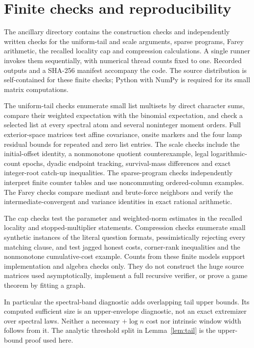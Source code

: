 \section{Finite checks and reproducibility}\label{sec:checks}
The ancillary directory contains the construction checks and independently written checks for the uniform-tail and scale arguments, sparse programs, Farey arithmetic, the recalled locality cap and compression calculations. A single runner invokes them sequentially, with numerical thread counts fixed to one. Recorded outputs and a SHA-256 manifest accompany the code. The source distribution is self-contained for these finite checks; Python with NumPy is required for its small matrix computations.

The uniform-tail checks enumerate small list multisets by direct character sums, compare their weighted expectation with the binomial expectation, and check a selected list at every spectral atom and several noninteger moment orders. Full exterior-space matrices test affine covariance, onsite markers and the four lamp residual bounds for repeated and zero list entries. The scale checks include the initial-offset identity, a nonmonotone quotient counterexample, legal logarithmic-count epochs, dyadic endpoint tracking, survival-mass differences and exact integer-root catch-up inequalities. The sparse-program checks independently interpret finite counter tables and use noncommuting ordered-column examples. The Farey checks compare mediant and brute-force neighbors and verify the intermediate-convergent and variance identities in exact rational arithmetic.

The cap checks test the parameter and weighted-norm estimates in the recalled locality and stopped-multiplier statements. Compression checks enumerate small synthetic instances of the literal question formats, pessimistically rejecting every matching clause, and test jagged honest costs, corner-rank inequalities and the nonmonotone cumulative-cost example. Counts from these finite models support implementation and algebra checks only. They do not construct the huge source matrices used asymptotically, implement a full recursive verifier, or prove a game theorem by fitting a graph.

In particular the spectral-band diagnostic adds overlapping tail upper bounds. Its computed sufficient size is an upper-envelope diagnostic, not an exact extremizer over spectral laws. Neither a necessary $+\log n$ cost nor intrinsic window width follows from it. The analytic threshold split in Lemma~\ref{lem:tail} is the upper-bound proof used here.
